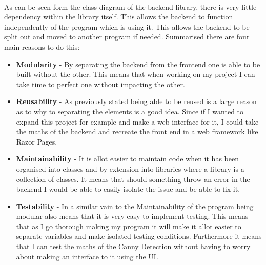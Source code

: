 \begin{FlushLeft}
    \begin{figure}[H]
        \centering
    \end{figure}

    \\

    As can be seen form the class diagram of the backend library, there is very little dependency within the library itself. This allows the backend to function independently of the program which is using it. This allows the backend to be split out and moved to another program if needed. Summarised there are four main reasons to do this:

    \begin{itemize}
        \item \textbf{Modularity} - By separating the backend from the frontend one is able to be built without the other. This means that when working on my project I can take time to perfect one without impacting the other.
        \item \textbf{Reusability} - As previously stated being able to be reused is a large reason as to why to separating the elements is a good idea. Since if I wanted to expand this project for example and make a web interface for it, I could take the maths of the backend and recreate the front end in a web framework like Razor Pages.
        \item \textbf{Maintainability} - It is allot easier to maintain code when it has been organised into classes and by extension into libraries where a library is a collection of classes. It means that should something throw an error in the backend I would be able to easily isolate the issue and be able to fix it.
        \item \textbf{Testability} - In a similar vain to the Maintainability of the program being modular also means that it is very easy to implement testing. This means that as I go thorough making my program it will make it allot easier to separate variables and make isolated testing conditions. Furthermore it means that I can test the maths of the Canny Detection without having to worry about making an interface to it using the UI.
    \end{itemize}
    \\ \BK


\end{FlushLeft}

